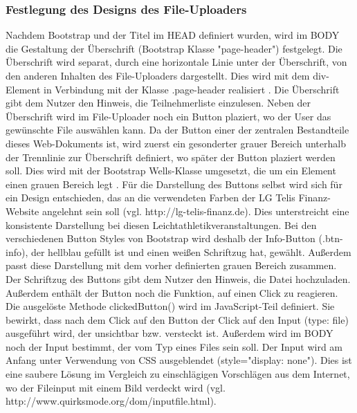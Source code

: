 \subsubsection{Festlegung des Designs des File-Uploaders}
Nachdem Bootstrap und der Titel im HEAD definiert wurden, wird im BODY die Gestaltung der Überschrift (Bootstrap Klasse "page-header") festgelegt. Die Überschrift wird separat, durch eine horizontale Linie unter der Überschrift, von den anderen Inhalten des File-Uploaders dargestellt. Dies wird mit dem div-Element in Verbindung mit der Klasse .page-header realisiert \cite{header}. Die Überschrift gibt dem Nutzer den Hinweis, die Teilnehmerliste einzulesen.
Neben der Überschrift wird im File-Uploader noch ein Button plaziert, wo der User das gewünschte File auswählen kann. Da der Button einer der zentralen Bestandteile dieses Web-Dokuments ist, wird zuerst ein gesonderter grauer Bereich unterhalb der Trennlinie zur Überschrift definiert, wo später der Button plaziert werden soll. Dies wird mit der Bootstrap Wells-Klasse umgesetzt, die um ein Element einen grauen Bereich legt \cite{wells}. 
Für die Darstellung des Buttons selbst wird sich für ein Design entschieden, das an die verwendeten Farben der LG Telis Finanz-Website angelehnt sein soll (vgl. http://lg-telis-finanz.de). Dies unterstreicht eine konsistente Darstellung bei diesen Leichtathletikveranstaltungen. Bei den verschiedenen Button Styles von Bootstrap wird deshalb der Info-Button (.btn-info), der hellblau gefüllt ist und einen weißen Schriftzug hat, gewählt. Außerdem passt diese Darstellung mit dem vorher definierten grauen Bereich zusammen. Der Schriftzug des Buttons gibt dem Nutzer den Hinweis, die Datei hochzuladen. Außerdem enthält der Button noch die Funktion, auf einen Click zu reagieren. Die ausgelöste Methode clickedButton() wird im JavaScript-Teil definiert. Sie bewirkt, dass nach dem Click auf den Button der Click auf den Input (type: file) ausgeführt wird, der unsichtbar bzw. versteckt ist.
Außerdem wird im BODY noch der Input bestimmt, der vom Typ eines Files sein soll. Der Input wird am Anfang unter Verwendung von CSS ausgeblendet (style="display: none"). Dies ist eine saubere Lösung im Vergleich zu einschlägigen Vorschlägen aus dem Internet, wo der Fileinput mit einem Bild verdeckt wird (vgl. http://www.quirksmode.org/dom/inputfile.html).

